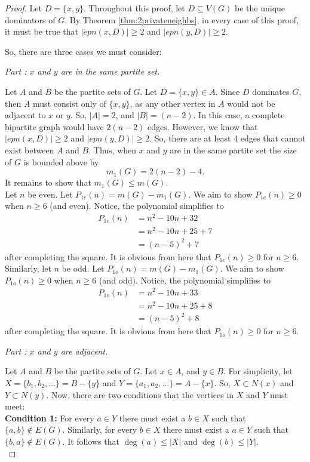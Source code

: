 \documentclass[12pt]{amsart}
\makeatletter
\newcounter{proofpart}
\newcommand{\proofpart}[1]{%
  \par
  \addvspace{\medskipamount}%
  \stepcounter{proofpart}%
  \noindent\emph{Part \theproofpart: #1}\par\nobreak\smallskip
  \@afterheading
}
\makeatother
\begin{document}
\begin{proof}
    Let $D = \{x,y\}$. Throughout this proof, let $D \subseteq V(G)$ be the unique dominators of $G$.  By Theorem \ref{thm:2privateneighbs}, in every case of this proof, it must be true that $|epn(x,D)| \geq 2$ and $|epn(y,D)| \geq 2$.
    
    So, there are three cases we must consider:
\proofpart{$x$ and $y$ are in the same partite set.}
Let $A$ and $B$ be the partite sets of $G$. Let $D = \{x,y\} \in A$. Since $D$ dominates $G$, then $A$ must consist only of $\{x,y\}$, as any other vertex in $A$ would not be adjacent to $x$ or $y$. So, $|A| = 2$, and $|B| = (n-2)$. In this case, a complete bipartite graph would have $2(n-2)$ edges. However, we know that $|epn(x,D)| \geq 2$ and $|epn(y,D)| \geq 2$. So, there are at least 4 edges that cannot exist between $A$ and $B$. Thus, when $x$ and $y$ are in the same partite set the size of $G$ is bounded above by $$m_1(G) = 2(n-2) - 4.$$ It remains to show that $m_1(G) \leq m(G).$\\
Let $n$ be even. Let $P_{1e}(n) = m(G) - m_1(G)$. We aim to show $P_{1e}(n) \geq 0$ when $n \geq 6$ (and even). Notice, the polynomial simplifies to \begin{align*}
P_{1e}(n) &= n^2 - 10n + 32  \\  
&= n^2 - 10n +25 + 7\\
&= (n-5)^2 + 7
\end{align*}
after completing the square. It is obvious from here that $P_{1e}(n) \geq 0$ for $n \geq 6$.\\
Similarly, let $n$ be odd.  Let $P_{1o}(n) = m(G) - m_1(G)$. We aim to show $P_{1o}(n) \geq 0$ when $n \geq 6$ (and odd). Notice, the polynomial simplifies to \begin{align*}
P_{1o}(n) &= n^2 - 10n + 33  \\  
&= n^2 - 10n +25 + 8\\
&= (n-5)^2 + 8
\end{align*}
after completing the square. It is obvious from here that $P_{1o}(n) \geq 0$ for $n \geq 6$.\\
\proofpart{$x$ and $y$ are adjacent.}
Let $A$ and $B$ be the partite sets of $G$. Let $x \in A$, and $y \in B$. For simplicity, let $X = \{b_1,b_2,\ldots\} = B - \{y\}$ and $Y = \{a_1,a_2,\ldots\} = A - \{x\}$. So, $X \subset N(x)$ and $Y \subset N(y)$. Now, there are two conditions that the vertices in $X$ and $Y$ must meet:\\
\textbf{Condition 1:} For every $a \in Y$ there must exist a $b \in X$ such that $\{a,b\} \notin E(G)$. Similarly, for every $b \in X$ there must exist a $a \in Y$ such that $\{b,a\} \notin E(G)$. It follows that $\deg(a) \leq |X|$ and $\deg(b) \leq |Y|$.\\

\end{proof}
\end{document}
